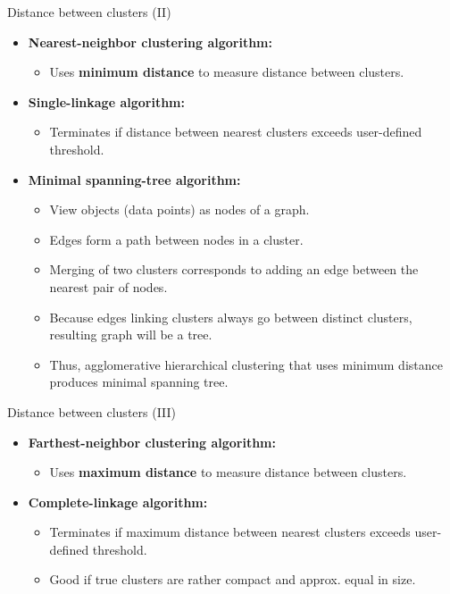 \documentclass[aspectratio=169,t,xcolor=dvipsnames]{beamer}
\begin{document}
  { %
    \begin{frame}{Distance between clusters (II)}
      \begin{itemize}
        \item \textbf{Nearest-neighbor clustering algorithm:}
        \begin{itemize}
          \item Uses \textbf{\color{airforceblue}minimum distance} to measure distance between clusters.
        \end{itemize}
        \item \textbf{Single-linkage algorithm:}
        \begin{itemize}
          \item Terminates if distance between nearest clusters exceeds user-defined threshold.
        \end{itemize}
        \item \textbf{Minimal spanning-tree algorithm:}
        \begin{itemize}
          \item View objects (data points) as nodes of a graph.
          \item Edges form a path between nodes in a cluster.
          \item Merging of two clusters corresponds to adding an edge between the nearest pair of nodes.
          \item Because edges linking clusters always go between distinct clusters,\\
          resulting graph will be a tree.
          \item Thus, agglomerative hierarchical clustering that uses minimum distance produces minimal spanning tree.
        \end{itemize}
      \end{itemize}
    \end{frame}
  }

  { %
    \begin{frame}{Distance between clusters (III)}
      \begin{itemize}
        \item \textbf{Farthest-neighbor clustering algorithm:}
        \begin{itemize}
          \item Uses \textbf{\color{airforceblue}maximum distance} to measure distance between clusters.
        \end{itemize}
        \item \textbf{Complete-linkage algorithm:}
        \begin{itemize}
          \item Terminates if maximum distance between nearest clusters exceeds user-defined threshold.
          \item Good if true clusters are rather compact and approx. equal in size.
        \end{itemize}
      \end{itemize}
    \end{frame}
  }
\end{document}
